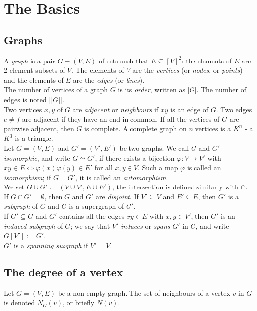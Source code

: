 
\chapter{The Basics}
	\section{Graphs}
		A \textit{graph} is a pair $G = (V, E)$ of sets such that $E \subseteq [V]^2$: the elements of $E$ are 2-element subsets of $V$. The elements of $V$ are the \textit{vertices} (or \textit{nodes}, or \textit{points}) and the elements of $E$ are the \textit{edges} (or \textit{lines}). \\
		
		The number of vertices of a graph $G$ is its \textit{order}, written as $|G|$. The number of edges is noted $||G||$. \\
		
		Two vertices $x, y$ of $G$ are \textit{adjacent} or \textit{neighbours} if $x y$ is an edge of $G$. Two edges $e \neq f$ are adjacent if they have an end in common. If all the vertices of $G$ are pairwise adjacent, then $G$ is complete. A complete graph on $n$ vertices is a $K^n$ - a $K^3$ is a triangle.\\ 
		
		Let $G = (V, E)$ and $G' = (V', E')$ be two graphs. We call $G$ and $G'$ \textit{isomorphic}, and write $G \simeq G'$, if there exists a bijection $\varphi: V \rightarrow V'$ with $xy \in E \iff \varphi(x) \varphi(y) \in E'$ for all $x, y \in V$. Such a map $\varphi$ is called an \textit{isomorphism}; if $G = G'$, it is called an \textit{automorphism}. \\
		
		We set $G \cup G' := (V \cup V', E \cup E')$, the intersection is defined similarly with $\cap$. If $G \cap G' = \emptyset$, then $G$ and $G'$ are \textit{disjoint}. If $V' \subseteq V$ and $E' \subseteq E$, then $G'$ is a \textit{subgraph} of $G$ and $G$ is a supergraph of $G'$.\\
		
		If $G' \subseteq G$ and $G'$ contains all the edges $xy \in E$ with $x, y \in V'$, then $G'$ is an \textit{induced subgraph} of $G$; we say that $V'$ \textit{induces} or \textit{spans} $G'$ in $G$,
                and write $G[V'] := G'$.\\

                $G'$ is a \textit{spanning subgraph} if $V' = V$.

	\section{The degree of a vertex}
		Let $G = (V, E)$ be a non-empty graph. The set of neighbours of a vertex $v$ in $G$ is denoted $N_G (v)$, or briefly $N(v)$.\\

